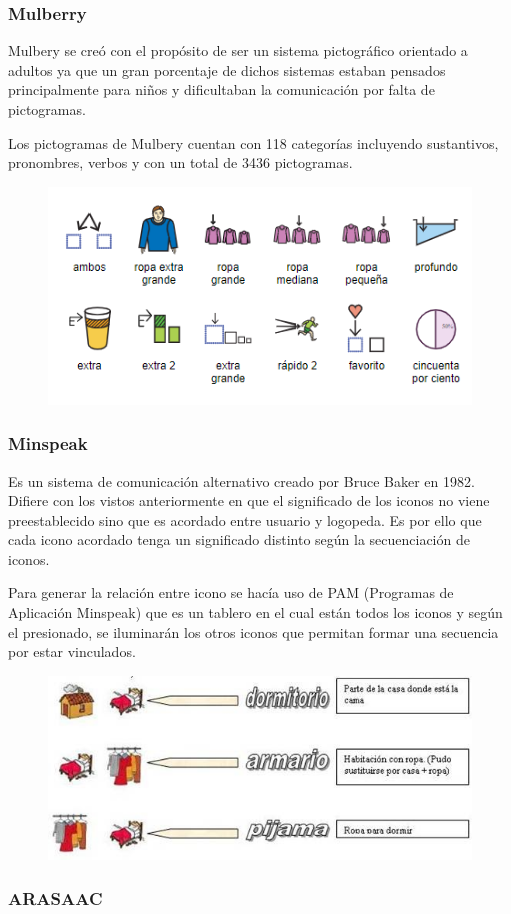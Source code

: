 \subsubsection{Mulberry}
Mulbery se creó con el propósito de ser un sistema pictográfico orientado a adultos ya que un gran porcentaje de dichos sistemas estaban pensados principalmente para niños y dificultaban la comunicación por falta de pictogramas.

Los pictogramas de Mulbery cuentan con 118 categorías incluyendo sustantivos, pronombres, verbos y con un total de 3436 pictogramas.

\begin{figure}[h!]
	\centering
	\includegraphics[width=0.7\linewidth]{Imagenes/Bitmap/Mulberry}
	\caption{}
	\label{fig:mulberry}
\end{figure}

\subsubsection{Minspeak}
Es un sistema de comunicación alternativo creado por Bruce Baker en 1982. Difiere con los vistos anteriormente en que el significado de los iconos no viene preestablecido sino que es acordado entre usuario y logopeda. Es por ello que cada icono acordado tenga un significado distinto según la secuenciación de iconos.

Para generar la relación entre icono se hacía uso de PAM (Programas de Aplicación Minspeak) que es un tablero en el cual están todos los iconos y según el presionado, se iluminarán los otros iconos que permitan formar una secuencia por estar vinculados.

\begin{figure}[h!]
	\centering
	\includegraphics[width=0.7\linewidth]{Imagenes/Bitmap/Minspeak}
	\caption{}
	\label{fig:minspeak}
\end{figure}


\subsubsection{ARASAAC}

